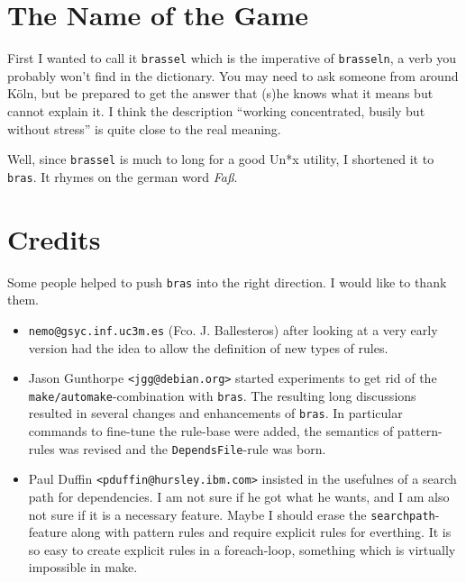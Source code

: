 \documentclass[12pt]{article}
\newcommand{\bras}{\texttt{bras}}
\begin{document}
\section{The Name of the Game}

First I wanted to call it \texttt{brassel} which is the imperative of
\texttt{brasseln}, a verb you probably won't find in the
dictionary. You may need to ask someone from around K\"oln, but be
prepared to get the answer that (s)he knows what it means but cannot
explain it. I think the description "`working concentrated, busily but
without stress"' is quite close to the real meaning.

Well, since \texttt{brassel} is much to long for a good
Un*x utility, I shortened it to \bras. It rhymes on the german word \textit{Fa\ss}.

\section{Credits}

Some people helped to push \bras{} into the right direction. I
would like to thank them. 

\begin{itemize}
\item \texttt{nemo@gsyc.inf.uc3m.es} (Fco. J. Ballesteros) after
looking at a very early version had the
idea to allow the definition of new types of rules.

\item Jason Gunthorpe \texttt{<jgg@debian.org>} started
experiments to get rid of the \texttt{make/automake}-combination with
\bras{}. The resulting long discussions resulted in several changes
and enhancements of \bras{}. In particular commands to fine-tune the
rule-base were added, the semantics of pattern-rules was revised and
the \texttt{DependsFile}-rule was born.

\item Paul Duffin \texttt{<pduffin@hursley.ibm.com>} insisted in the
  usefulnes of a search path for dependencies. I am not sure if he got
  what he wants, and I am also not sure if it is a necessary
  feature. Maybe I should erase the \texttt{searchpath}-feature along
  with pattern rules and require explicit rules for everthing. It is
  so easy to create explicit rules in a foreach-loop, something which
  is virtually impossible in make.

\end{itemize}
\end{document}
